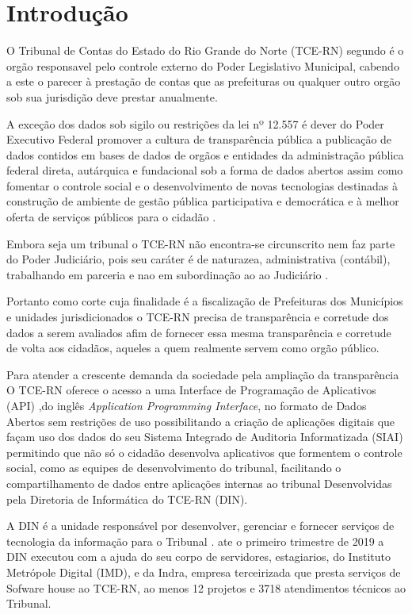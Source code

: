 \chapter[Introdução]{Introdução}
\label{ch:introducao}

  O Tribunal de Contas do Estado do Rio Grande do Norte (TCE-RN) segundo \cite{Legislativa} é o orgão responsavel pelo controle externo do Poder Legislativo Municipal, cabendo a este o parecer à prestação de contas que as prefeituras ou qualquer outro orgão sob sua jurisdição deve prestar anualmente.

  A exceção dos dados sob sigilo ou restrições da lei nº 12.557 \cite{lei_12527} é dever do Poder Executivo Federal promover a cultura de transparência pública a publicação de dados contidos em bases de dados de orgãos e entidades da administração pública federal direta, autárquica e fundacional sob a forma de dados abertos assim como fomentar o controle social e o desenvolvimento de novas tecnologias destinadas à construção de ambiente de gestão pública participativa e democrática e à melhor oferta de serviços públicos para o cidadão \cite{dec_8777}.

  Embora seja um tribunal o TCE-RN não encontra-se circunscrito nem faz parte do Poder Judiciário, pois seu caráter é de naturazea, administrativa (contábil), trabalhando em parceria e nao em subordinação ao  ao Judiciário \cite{barreto_tribunais}.

  Portanto como corte cuja finalidade é a fiscalização de Prefeituras dos Municípios e unidades jurisdicionados o TCE-RN precisa de transparência e corretude dos dados a serem avaliados afim de fornecer essa mesma transparência e corretude de volta aos cidadãos, aqueles a quem realmente servem como orgão público.

  Para atender a crescente demanda da sociedade pela ampliação da transparência O TCE-RN oferece o acesso a uma Interface de Programação de Aplicativos (API) ,do inglês \textit{Application Programming Interface}, no formato de Dados Abertos sem restrições de uso possibilitando a criação de aplicações digitais \cite{dados_abertos_tcern} que façam uso dos dados do seu Sistema Integrado de Auditoria Informatizada (SIAI) permitindo que não só o cidadão desenvolva aplicativos que formentem o controle social, como as equipes de desenvolvimento do tribunal, facilitando o compartilhamento de dados entre aplicações internas ao tribunal Desenvolvidas pela Diretoria de Informática do TCE-RN (DIN).

  A DIN é a unidade responsável por desenvolver, gerenciar e fornecer serviços de tecnologia da informação para o Tribunal \cite{relatorio_trimestral}. ate o primeiro trimestre de 2019 a DIN executou com a ajuda do seu corpo de servidores, estagiarios, do Instituto Metrópole Digital (IMD), e da Indra, empresa terceirizada que presta serviços de Sofware house ao TCE-RN, ao menos 12 projetos e 3718 atendimentos técnicos ao Tribunal.

